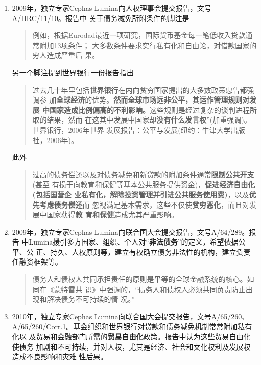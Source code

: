 \begin{enumerate}
\item 2009年，独立专家Cephas Lumina向人权理事会提交报告，文号A/HRC/11/10。报告中
  关于债务减免所附条件的脚注是
  \begin{quotation}
    例如，根据Eurodad最近一项研究，国际货币基金每一笔低收入贷款通常附加13项条件；
    大多数条件要求实行私有化和自由论，对借款国家的穷人造成严重后
    果。
  \end{quotation}
  另一个脚注提到世界银行一份报告指出
  \begin{quotation}
    过去几十年里包括\textbf{世界银行}在内向贫穷国家提出的大多数政策忠告都强调参
    加\textbf{全球经济}的优势。\textbf{然而全球市场远非公平，其运作管理规则对发展
      中国家造成比例偏高的不利影响。}这些规则是经过复杂的谈判进程所取的结果，然而
    在这其中发展中国家却\textbf{没有什么发言权}”(加重强调)。世界银行，2006年世界
    发展报告：公平与发展(纽约：牛津大学出版社，2006年)。
  \end{quotation}
  此外
  \begin{quotation}
    过高的债务偿还以及对债务减免和新贷款的附加条件通常\textbf{限制公共开支}(甚至
    有损于向教育和保健等基本公共服务提供资金)，\textbf{促进经济自由化(包括国营企
      业私有化，解除投资管理并引进公共服务使用费)}，以及\textbf{优先考虑债务偿还}而
    忽视满足基本需求，这些不仅使\textbf{贫穷恶化}，而且对发展中国家获得\textbf{教
      育和保健}造成尤其严重影响。
  \end{quotation}

\item 2009年，独立专家Cephas Lumina向联合国大会提交报告，文号A/64/289。报告
  中Lumina援引多方国家、组织、个人对“\textbf{非法债务}”的定义，希望依据公平、公
  正、持久、人权原则等，建立有权确立债务非法性的机构，建立负责任融资框架等。
  \begin{quotation}
    债务人和债权人共同承担责任的原则是平等的全球金融系统的核心。如同在《蒙特雷共
    识》中强调的，“债务人和债权人必须共同负责防止出现和解决债务不可持续的情
    况。”
  \end{quotation}

\item 2010年，独立专家Cephas Lumina向联合国大会提交报告，文号A/65/260、
  A/65/260/Corr.1。基金组织和世界银行对贷款和债务减免机制常常附加私有化以
  及贸易和金融部门所需的\textbf{贸易自由化}政策。报告中认为这些贸易自由化使债务
  加剧和不可持续，并对人权，尤其是经济、社会和文化权利及发展权造成不良影响和灾难
  性后果。


\end{enumerate}
